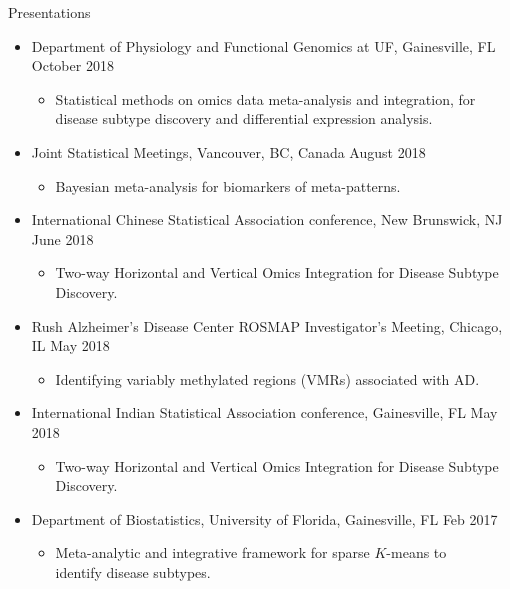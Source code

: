 \documentclass{resume} %
\begin{document}
\begin{rSection}{Presentations}
\begin{itemize}[noitemsep,topsep=0pt]
\item  Department of Physiology and Functional Genomics at UF, Gainesville, FL  \hfill {October 2018}
\begin{itemize}[noitemsep,topsep=0pt]
\item{Statistical methods on omics data meta-analysis and integration, for \\
disease subtype discovery and differential expression analysis.}
\end{itemize}

\item  Joint Statistical Meetings, Vancouver, BC, Canada  \hfill {August 2018}
\begin{itemize}[noitemsep,topsep=0pt]
\item{Bayesian meta-analysis for biomarkers of meta-patterns.}
\end{itemize}

\item  International Chinese Statistical Association conference, New Brunswick, NJ  \hfill {June 2018}
\begin{itemize}[noitemsep,topsep=0pt]
\item{Two-way Horizontal and Vertical Omics Integration for Disease Subtype Discovery.}
\end{itemize}


\item  Rush Alzheimer's Disease Center ROSMAP Investigator's Meeting, Chicago, IL  \hfill {May 2018}
\begin{itemize}[noitemsep,topsep=0pt]
\item{Identifying variably methylated regions (VMRs) associated with AD.}
\end{itemize}

\item  International Indian Statistical Association conference, Gainesville, FL \hfill {May 2018}
\begin{itemize}[noitemsep,topsep=0pt]
\item{Two-way Horizontal and Vertical Omics Integration for Disease Subtype Discovery.}
\end{itemize}

\item  Department of Biostatistics, University of Florida, Gainesville, FL \hfill {Feb 2017}
\begin{itemize}[noitemsep,topsep=0pt]
\item{Meta-analytic and integrative framework for sparse $K$-means to\\ identify disease subtypes.}
\end{itemize}



\end{itemize}
\end{rSection}
\end{document}

